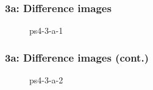 \documentclass[../report.tex]{subfiles}
\begin{document}
    \begin{frame}
        \frametitle{3a: Difference images}
        \begin{figure}[!htb]
            \centering
            \caption{ps4-3-a-1}
        \end{figure}    
    \end{frame}

    \begin{frame}
        \frametitle{3a: Difference images (cont.)}
        \begin{figure}[!htb]
            \centering
            \caption{ps4-3-a-2}
        \end{figure}    
    \end{frame}
    
\end{document}
